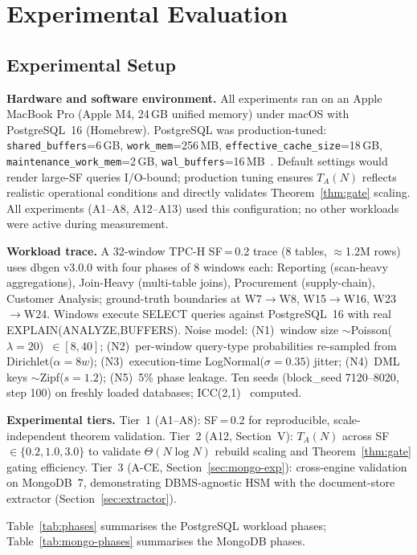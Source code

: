 \documentclass[10pt,twocolumn,a4paper]{article}
\begin{document}
\section{Experimental Evaluation}

\subsection{Experimental Setup}

\textbf{Hardware and software environment.} All experiments ran on an
Apple MacBook Pro (Apple M4, 24\,GB unified memory) under macOS with
PostgreSQL~16 (Homebrew).
PostgreSQL was production-tuned: \texttt{shared\_buffers}=6\,GB,
\texttt{work\_mem}=256\,MB, \texttt{effective\_cache\_size}=18\,GB,
\texttt{maintenance\_work\_mem}=2\,GB,
\texttt{wal\_buffers}=16\,MB~\cite{PostgreSQL2024Tuning,PostgreSQL2024Config}.
Default settings would render large-SF queries I/O-bound; production tuning
ensures $T_A(N)$ reflects realistic operational conditions and directly
validates Theorem~\ref{thm:gate} scaling. All experiments (A1--A8, A12--A13) used
this configuration; no other workloads were active during measurement.

\textbf{Workload trace.} A 32-window TPC-H SF\,=\,0.2 trace (8 tables,
$\approx$1.2M rows) uses dbgen v3.0.0 with four phases of 8 windows
each: Reporting (scan-heavy aggregations), Join-Heavy (multi-table
joins), Procurement (supply-chain), Customer Analysis; ground-truth
boundaries at W7$\to$W8, W15$\to$W16, W23$\to$W24. Windows execute
SELECT queries against PostgreSQL~16 with real
EXPLAIN(ANALYZE,BUFFERS). Noise model: (N1)~window size
$\sim$Poisson($\lambda\!=\!20$)~$\in[8,40]$; (N2)~per-window query-type
probabilities re-sampled from Dirichlet($\alpha\!=\!8w$);
(N3)~execution-time LogNormal($\sigma\!=\!0.35$) jitter; (N4)~DML keys
$\sim$Zipf($s\!=\!1.2$); (N5)~5\% phase leakage. Ten seeds
(block\_seed 7120--8020, step 100)
on freshly loaded databases; ICC(2,1)~\cite{Cicchetti1994ICC} computed.

\textbf{Experimental tiers.} Tier~1 (A1--A8): SF\,=\,0.2 for
reproducible, scale-independent theorem validation. Tier~2 (A12,
Section~V): $T_A(N)$ across SF\,$\in\{0.2,1.0,3.0\}$ to validate
$\Theta(N\log N)$ rebuild scaling and Theorem~\ref{thm:gate} gating efficiency.
Tier~3 (A-CE, Section~\ref{sec:mongo-exp}): cross-engine validation on
MongoDB~7, demonstrating DBMS-agnostic HSM with the document-store
extractor (Section~\ref{sec:extractor}).

Table~\ref{tab:phases} summarises the PostgreSQL workload phases;
Table~\ref{tab:mongo-phases} summarises the MongoDB phases.
\end{document}
